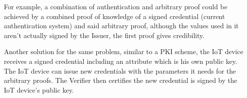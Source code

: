 \begin{itemize}
	For example, a combination of authentication and arbitrary proof could be achieved by a combined proof of knowledge of a signed credential (current authentication system) and said arbitrary proof, although the values used in it aren't actually signed by the Issuer, the first proof gives credibility.
	
	Another solution for the same problem, similar to a PKI scheme, the IoT device receives a signed credential including an attribute which is his own public key. The IoT device can issue new credentials with the parameters it needs for the arbitrary proofs. The Verifier then certifies the new credential is signed by the IoT device's public key.
	
\end{itemize}


